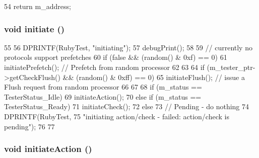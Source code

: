 \begin{DoxyCode}
54 { return m_address; }
\end{DoxyCode}
\hypertarget{classCheck_ad0188ca8aaba0189f9efa4b14bb7940b}{
\subsubsection[{initiate}]{\setlength{\rightskip}{0pt plus 5cm}void initiate ()}}
\label{classCheck_ad0188ca8aaba0189f9efa4b14bb7940b}



\begin{DoxyCode}
55 {
56     DPRINTF(RubyTest, "initiating\n");
57     debugPrint();
58 
59     // currently no protocols support prefetches
60     if (false && (random() & 0xf) == 0) {
61         initiatePrefetch(); // Prefetch from random processor
62     }
63 
64     if (m_tester_ptr->getCheckFlush() && (random() & 0xff) == 0) {
65         initiateFlush(); // issue a Flush request from random processor
66     }
67 
68     if (m_status == TesterStatus_Idle) {
69         initiateAction();
70     } else if (m_status == TesterStatus_Ready) {
71         initiateCheck();
72     } else {
73         // Pending - do nothing
74         DPRINTF(RubyTest,
75                 "initiating action/check - failed: action/check is pending\n");
76     }
77 }
\end{DoxyCode}
\hypertarget{classCheck_a1b2221f5b5047c8b42b6bb5407406a9a}{
\subsubsection[{initiateAction}]{\setlength{\rightskip}{0pt plus 5cm}void initiateAction ()}}
\label{classCheck_a1b2221f5b5047c8b42b6bb5407406a9a}



